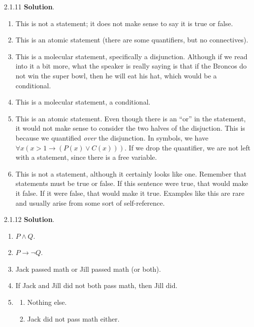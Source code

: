 \documentclass[11pt,]{book}
\theoremstyle{ptxplainnotitle}
\theoremstyle{ptxplaintitle}
\theoremstyle{ptxdefinitionnotitle}
\theoremstyle{ptxdefinitiontitle}
\theoremstyle{ptxdefinitionnotitle}
\theoremstyle{ptxdefinitiontitle}
\theoremstyle{ptxdefinitionnotitle}
\theoremstyle{ptxdefinitiontitle}
\theoremstyle{ptxdefinitiontitlenonumber}
\theoremstyle{ptxdefinitiontitlenonumber}
\numberwithin{equation}{chapter}
\newcommand{\imp}{\rightarrow}
\begin{document}
\begin{divisionexercise}{2.1.11}
\textbf{Solution}.\quad%
\hypertarget{p-2271}{}%
\leavevmode%
\begin{enumerate}[label=(\alph*)]
\item\hypertarget{li-1147}{}This is not a statement; it does not make sense to say it is true or false.%
\item\hypertarget{li-1148}{}This is an atomic statement (there are some quantifiers, but no connectives).%
\item\hypertarget{li-1149}{}This is a molecular statement, specifically a disjunction.  Although if we read into it a bit more, what the speaker is really saying is that if the Broncos do not win the super bowl, then he will eat his hat, which would be a conditional.%
\item\hypertarget{li-1150}{}This is a molecular statement, a conditional.%
\item\hypertarget{li-1151}{}This is an atomic statement.  Even though there is an ``or'' in the statement, it would not make sense to consider the two halves of the disjuction.  This is because we quantified \emph{over} the disjunction.  In symbols, we have \(\forall x (x > 1 \imp (P(x) \vee C(x)))\).  If we drop the quantifier, we are not left with a statement, since there is a free variable.%
\item\hypertarget{li-1152}{}This is not a statement, although it certainly looks like one.  Remember that statements must be true or false.  If this sentence were true, that would make it false.  If it were false, that would make it true.  Examples like this are rare and usually arise from some sort of self-reference.%
\end{enumerate}
%
\end{divisionexercise}%
\begin{divisionexercise}{2.1.12}
\textbf{Solution}.\quad%
\hypertarget{p-2278}{}%
\leavevmode%
\begin{enumerate}[label=(\alph*)]
\item\hypertarget{li-1160}{}\(P \wedge Q\).%
\item\hypertarget{li-1161}{}\(P \imp \neg Q\).%
\item\hypertarget{li-1162}{}\hypertarget{p-2279}{}%
Jack passed math or Jill passed math (or both).%
\item\hypertarget{li-1163}{}\hypertarget{p-2280}{}%
If Jack and Jill did not both pass math, then Jill did.%
\item\hypertarget{li-1164}{}\hypertarget{p-2281}{}%
%
\begin{enumerate}[label=\roman*.]
\item\hypertarget{li-1165}{}Nothing else.%
\item\hypertarget{li-1166}{}Jack did not pass math either.%
\end{enumerate}
%
\end{enumerate}
%
\end{divisionexercise}%
\end{document}
